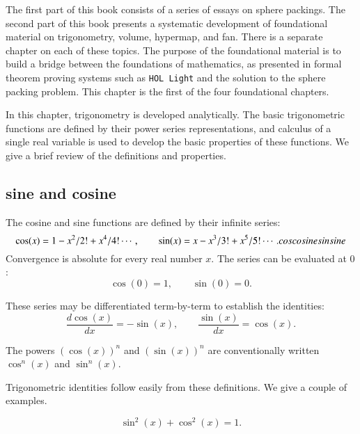 

The first part of this book consists of a series of essays
on sphere packings.  The second part of this book presents
a systematic development of foundational material on
trigonometry, volume, hypermap, and fan.  There is a separate
chapter on each of these topics.  The purpose of the
foundational material is to build a bridge between
the foundations of mathematics, as presented in formal
theorem proving systems such as {\tt HOL Light} and the
solution to the sphere packing problem.  
This chapter is the first of the four foundational chapters.


In this chapter, trigonometry is developed analytically.  The basic
trigonometric functions are defined by their power series
representations, and calculus of a single real variable is used to
develop the basic properties of these functions.  We give a brief
review of the definitions and properties.


\subsection{sine and cosine}

The cosine and sine functions are defined by their infinite series:%
%
    \begin{equation}\label{eqn:cos-def}\cos(x) = 1 - x^2/2! + x^4/4! \cdots,\qquad
  \sin(x) = x - x^3/3! + x^5/5! \cdots.
    \index{Index}{cos}\index{Index}{cosine}\index{Index}{sin}\index{Index}{sine}
    \end{equation}
Convergence is absolute for every real number $x$.
The series can be evaluated at $0$:
    \begin{equation}\label{eqn:cos0}
    \cos(0) = 1,\qquad \sin(0) = 0.
    \end{equation}

These series may be differentiated term-by-term to establish the identities:
    \begin{equation}\label{eqn:cos'}
    \frac{d \cos(x)}{dx} = -\sin(x),\qquad \frac{ \sin(x)}{dx} = \cos(x).
    \end{equation}

The powers $(\cos(x))^n$ and $(\sin(x))^n$ are conventionally written
$\cos^n(x)$ and $\sin^n(x)$.

Trigonometric identities follow easily from these definitions.  We
give a couple of examples.

\begin{lemma}\label{lemma:circle} 
   $$\sin^2(x) + \cos^2(x) = 1.$$
\end{lemma}

